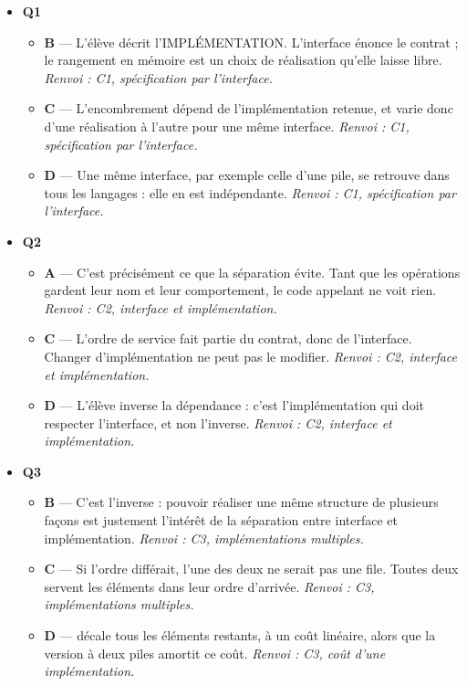 \begin{itemize}
  \item \textbf{Q1}
  \begin{itemize}
    \item \textbf{B} — L'élève décrit l'IMPLÉMENTATION. L'interface énonce le contrat ; le rangement en mémoire est un choix de réalisation qu'elle laisse libre. \emph{Renvoi : C1, spécification par l'interface.}
    \item \textbf{C} — L'encombrement dépend de l'implémentation retenue, et varie donc d'une réalisation à l'autre pour une même interface. \emph{Renvoi : C1, spécification par l'interface.}
    \item \textbf{D} — Une même interface, par exemple celle d'une pile, se retrouve dans tous les langages : elle en est indépendante. \emph{Renvoi : C1, spécification par l'interface.}
  \end{itemize}
  \item \textbf{Q2}
  \begin{itemize}
    \item \textbf{A} — C'est précisément ce que la séparation évite. Tant que les opérations gardent leur nom et leur comportement, le code appelant ne voit rien. \emph{Renvoi : C2, interface et implémentation.}
    \item \textbf{C} — L'ordre de service fait partie du contrat, donc de l'interface. Changer d'implémentation ne peut pas le modifier. \emph{Renvoi : C2, interface et implémentation.}
    \item \textbf{D} — L'élève inverse la dépendance : c'est l'implémentation qui doit respecter l'interface, et non l'inverse. \emph{Renvoi : C2, interface et implémentation.}
  \end{itemize}
  \item \textbf{Q3}
  \begin{itemize}
    \item \textbf{B} — C'est l'inverse : pouvoir réaliser une même structure de plusieurs façons est justement l'intérêt de la séparation entre interface et implémentation. \emph{Renvoi : C3, implémentations multiples.}
    \item \textbf{C} — Si l'ordre différait, l'une des deux ne serait pas une file. Toutes deux servent les éléments dans leur ordre d'arrivée. \emph{Renvoi : C3, implémentations multiples.}
    \item \textbf{D} —  décale tous les éléments restants, à un coût linéaire, alors que la version à deux piles amortit ce coût. \emph{Renvoi : C3, coût d'une implémentation.}

\end{itemize}
\end{itemize}
